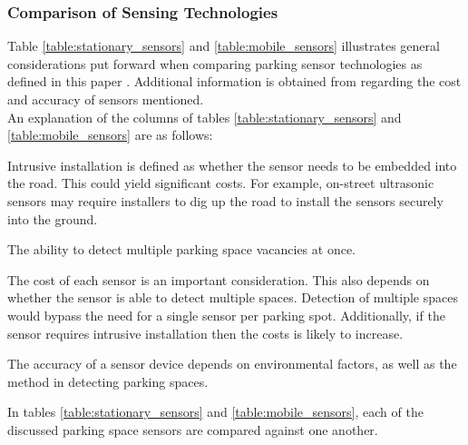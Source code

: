 \subsubsection*{Comparison of Sensing Technologies}
Table \ref{table:stationary_sensors} and \ref{table:mobile_sensors} illustrates general considerations put forward when comparing parking sensor technologies as defined in this paper \citep{Lin2015SmartService}. Additional information is obtained from \citep{dokur_embedded_2016} regarding the cost and accuracy of sensors mentioned. \\

\noindent An explanation of the columns of tables \ref{table:stationary_sensors} and \ref{table:mobile_sensors} are as follows:
\begin{description}[leftmargin=14em, style=nextline]
    \item[Intrusive Installation (IV)] Intrusive installation is defined as whether the sensor needs to be embedded into the road. This could yield significant costs. For example, on-street ultrasonic sensors may require installers to dig up the road to install the sensors securely into the ground.
    \item[Multiple Detection (MD)] The ability to detect multiple parking space vacancies at once.
    \item[Cost (C)] The cost of each sensor is an important consideration. This also depends on whether the sensor is able to detect multiple spaces. Detection of multiple spaces would bypass the need for a single sensor per parking spot. Additionally, if the sensor requires intrusive installation then the costs is likely to increase.
    \item[Accuracy (A)] The accuracy of a sensor device depends on environmental factors, as well as the method in detecting parking spaces.
\end{description}

In tables \ref{table:stationary_sensors} and \ref{table:mobile_sensors}, each of the discussed parking space sensors are compared against one another. 

